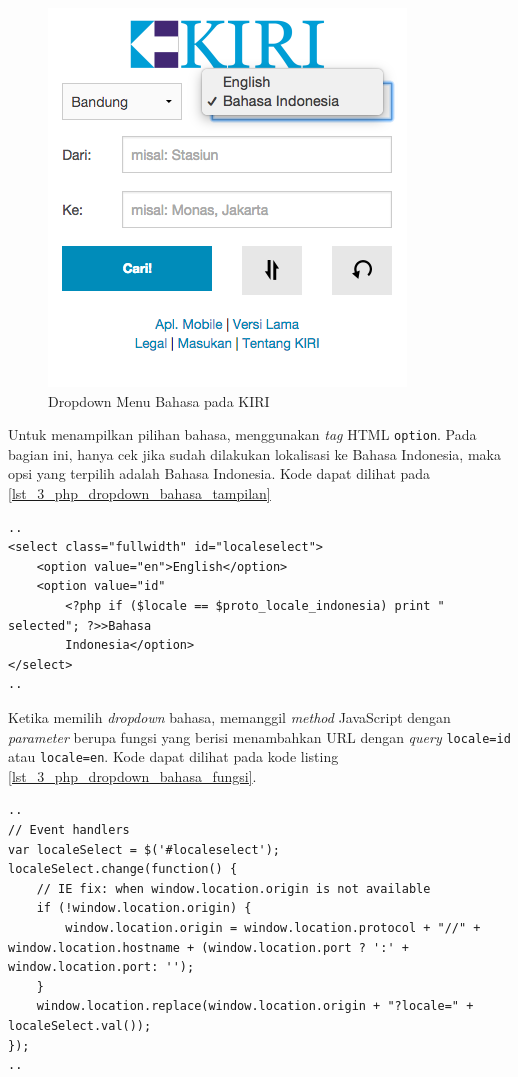 \begin{figure}[H]
	\centering
	\includegraphics[scale=0.5]{Gambar/KIRI-drop-bahasa}
	\caption{Dropdown Menu Bahasa pada KIRI} 
	\label{fig:3_KIRI_drop_bahasa}
\end{figure}

Untuk menampilkan pilihan bahasa, menggunakan \textit{tag} HTML \verb!option!. Pada bagian ini, hanya cek jika sudah dilakukan lokalisasi ke Bahasa Indonesia, maka opsi yang terpilih adalah Bahasa Indonesia. Kode dapat dilihat pada \ref{lst_3_php_dropdown_bahasa_tampilan}

\begin{lstlisting}[caption=Menampilkan pilihan bahasa kepada pengguna ,label = {lst_3_php_dropdown_bahasa_tampilan}]
..
<select class="fullwidth" id="localeselect">
	<option value="en">English</option>
	<option value="id"
		<?php if ($locale == $proto_locale_indonesia) print " selected"; ?>>Bahasa
		Indonesia</option>
</select>
..
\end{lstlisting}

Ketika memilih \textit{dropdown} bahasa, memanggil \textit{method} JavaScript dengan \textit{parameter} berupa fungsi yang berisi menambahkan URL dengan \textit{query} \verb!locale=id! atau \verb!locale=en!. Kode dapat dilihat pada kode listing \ref{lst_3_php_dropdown_bahasa_fungsi}.

\begin{lstlisting}[caption=Fungsi JavaScript untuk Internationalization ,label = {lst_3_php_dropdown_bahasa_fungsi}]
..
// Event handlers
var localeSelect = $('#localeselect');
localeSelect.change(function() {
	// IE fix: when window.location.origin is not available 
	if (!window.location.origin) {
		window.location.origin = window.location.protocol + "//" + window.location.hostname + (window.location.port ? ':' + window.location.port: '');
	}
	window.location.replace(window.location.origin + "?locale=" + localeSelect.val());
});
..
\end{lstlisting}


